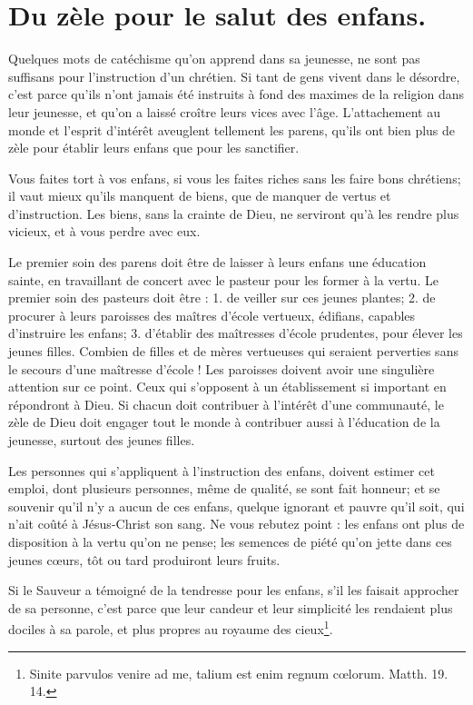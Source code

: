 \documentclass[instructions.tex]{subfiles}
\begin{document}
 
\chapter{Du zèle pour le salut des enfans.}
 
\primo Quelques mots de catéchisme qu’on apprend dans sa jeunesse, ne sont pas suffisans pour l’instruction d’un chrétien. Si tant de gens vivent dans le désordre, c’est parce qu’ils n’ont jamais été instruits à fond des maximes de la religion dans leur jeunesse, et qu’on a laissé croître leurs vices avec l’âge. L’attachement au monde et l’esprit d’intérêt aveuglent tellement les parens, qu’ils ont bien plus de zèle pour établir leurs enfans que pour les sanctifier.
 
Vous faites tort à vos enfans, si vous les faites riches sans les faire bons chrétiens; il vaut mieux qu’ils manquent de biens, que de manquer de vertus et d’instruction. Les biens, sans la crainte de Dieu, ne serviront qu’à les rendre plus vicieux, et à vous perdre avec eux.
 
Le premier soin des parens doit être de laisser à leurs enfans une éducation sainte, en travaillant de concert avec le pasteur pour les former à la vertu. Le premier soin des pasteurs doit être : 1. de veiller sur ces jeunes plantes; 2. de procurer à leurs paroisses des maîtres d’école vertueux, édifians, capables d’instruire les enfans; 3. d’établir des maîtresses d’école prudentes, pour élever les jeunes filles. Combien de filles et de mères vertueuses qui seraient perverties sans le secours d’une maîtresse d’école ! Les paroisses doivent avoir une singulière attention sur ce point. Ceux qui s’opposent à un établissement si important en répondront à Dieu. Si chacun doit contribuer à l’intérêt d’une communauté, le zèle de Dieu doit engager tout le monde à contribuer aussi à l’éducation de la jeunesse, surtout des jeunes filles.
 
\secundo Les personnes qui s’appliquent à l’instruction des enfans, doivent estimer cet emploi, dont plusieurs personnes, même de qualité, se sont fait honneur; et se souvenir qu’il n’y a aucun de ces enfans, quelque ignorant et pauvre qu’il soit, qui n’ait coûté à Jésus-Christ son sang. Ne vous rebutez point : les enfans ont plus de disposition à la vertu qu’on ne pense; les semences de piété qu’on jette dans ces jeunes cœurs, tôt ou tard produiront leurs fruits.
 
Si le Sauveur a témoigné de la tendresse pour les enfans, s’il les faisait approcher de sa personne, c’est parce que leur candeur et leur simplicité les rendaient plus dociles à sa parole, et plus propres au royaume des cieux\footnote{Sinite parvulos venire ad me, talium est enim regnum cœlorum. Matth. 19. 14.}.
 
\end{document}
